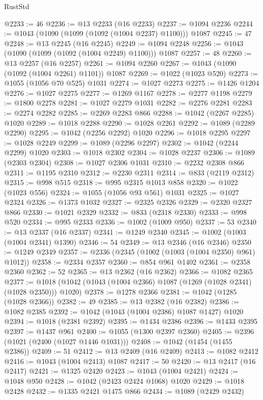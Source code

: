 \begin{lexlean}{RustStd}
\begin{coremodule}
@2233 := 46
@2236 := @13 @2233 (@16 @2233)
@2237 := @1094 @2236
@2244 := @1043 (@1090 (@1099 (@1092 (@1004 @2237) @1100))) @1087
@2245 := 47
@2248 := @13 @2245 (@16 @2245)
@2249 := @1094 @2248
@2256 := @1043 (@1090 (@1099 (@1092 (@1004 @2249) @1100))) @1087
@2257 := 48
@2260 := @13 @2257 (@16 @2257)
@2261 := @1094 @2260
@2267 := @1043 (@1090 (@1092 (@1004 @2261) @1101)) @1087
@2269 := @1022 (@1023 @520)
@2273 := @1055 (@1056 @70 @525) @1031
@2274 := @1027 @2273
@2275 := @1426 @1204
@2276 := @1027 @2275
@2277 := @1269 @1167
@2278 := @2277 @1198
@2279 := @1800 @2278
@2281 := @1027 @2279 @1031
@2282 := @2276 @2281
@2283 := @2274 @2282
@2285 := @2269 @2283 @866
@2288 := @1042 (@2267 @2285) @1020
@2289 := @1018 @2288
@2290 := @1028 @2261
@2292 := @1089 (@2289 @2290)
@2295 := @1042 (@2256 @2292) @1020
@2296 := @1018 @2295
@2297 := @1028 @2249
@2299 := @1089 (@2296 @2297)
@2302 := @1042 (@2244 @2299) @1020
@2303 := @1018 @2302
@2304 := @1028 @2237
@2306 := @1089 (@2303 @2304)
@2308 := @1027 @2306 @1031
@2310 := @2232 @2308 @866
@2311 := @1195 @2310
@2312 := @2230 @2311
@2314 := @833 (@2119 @2312)
@2315 := @998 @515
@2318 := @995 @2315 @1013 @858
@2320 := @1022 (@1023 @556)
@2324 := @1055 (@1056 @93 @561) @1031
@2325 := @1027 @2324
@2326 := @1373 @1032
@2327 := @2325 @2326
@2329 := @2320 @2327 @866
@2330 := @1021 @2329
@2332 := @833 (@2318 @2330)
@2333 := @998 @520
@2334 := @995 @2333
@2336 := @1002 (@1009 @950)
@2337 := 53
@2340 := @13 @2337 (@16 @2337)
@2341 := @1249 @2340
@2345 := @1002 (@1003 (@1004 @2341) @1390)
@2346 := 54
@2349 := @13 @2346 (@16 @2346)
@2350 := @1249 @2349
@2357 := @2336 (@2345 (@1002 (@1003 (@1004 @2350) @961) @1012))
@2358 := @2334 @2357
@2360 := @854 @961 @1402
@2361 := @2358 @2360
@2362 := 52
@2365 := @13 @2362 (@16 @2362)
@2366 := @1082 @2365
@2377 := @1018 (@1042 (@1043 (@1004 @2366) @1087 (@1269 (@1028 @2341) (@1028 @2350))) @1020)
@2378 := @1278 @2366
@2381 := @1042 (@1285 (@1028 @2366))
@2382 := 49
@2385 := @13 @2382 (@16 @2382)
@2386 := @1082 @2385
@2392 := @1042 (@1043 (@1004 @2386) @1087 @1427) @1020
@2394 := @1018 (@2381 @2392)
@2395 := @1434 @2386
@2396 := @1433 @2395
@2397 := @1437 @961
@2400 := @1055 (@1300 @2397 @2360)
@2405 := @2396 (@1021 (@2400 (@1027 @1446 @1031)))
@2408 := @1042 (@1454 (@1455 @2386))
@2409 := 51
@2412 := @13 @2409 (@16 @2409)
@2413 := @1082 @2412
@2416 := @1043 (@1004 @2413) @1087
@2417 := 50
@2420 := @13 @2417 (@16 @2417)
@2421 := @1325 @2420
@2423 := @1043 (@1004 @2421)
@2424 := @1048 @950
@2428 := @1042 (@2423 @2424 @1068) @1020
@2429 := @1018 @2428
@2432 := @1335 @2421 @1475 @866
@2434 := @1089 (@2429 @2432)

\end{coremodule}
\end{lexlean}
